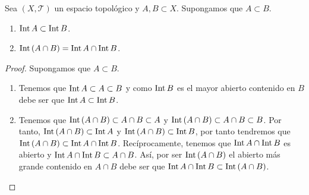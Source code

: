 \begin{prop}
Sea $\displaystyle \left(X, \mathcal{T}\right) $ un espacio topológico y $\displaystyle A,B\subset X $. Supongamos que $\displaystyle A \subset B $. 
\begin{enumerate}
\item $\displaystyle \operatorname{Int} A \subset \operatorname{Int} B $. 
\item $\displaystyle \operatorname{Int} \left(A \cap B\right)= \operatorname{Int} A \cap \operatorname{Int} B $. 
\end{enumerate}
\end{prop}
\begin{proof}
Supongamos que $\displaystyle A \subset B $. 
\begin{enumerate}
\item Tenemos que $\displaystyle \operatorname{Int} A \subset A \subset B $ y como $\displaystyle \operatorname{Int} B $ es el mayor abierto contenido en $\displaystyle B $ debe ser que $\displaystyle \operatorname{Int} A \subset \operatorname{Int} B $. 
\item Tenemos que $\displaystyle \operatorname{Int} \left(A \cap B\right)\subset A \cap B \subset A $ y $\displaystyle \operatorname{Int} \left(A \cap B\right)\subset A \cap B \subset B $. Por tanto, $\displaystyle \operatorname{Int}\left(A \cap B\right)\subset \operatorname{Int} A $ y $\displaystyle \operatorname{Int} \left(A \cap B\right)\subset \operatorname{Int} B $, por tanto tendremos que $\displaystyle \operatorname{Int}\left(A \cap B\right)\subset \operatorname{Int} A \cap \operatorname{Int} B $. Recíprocamente, tenemos que $\displaystyle \operatorname{Int} A \cap \operatorname{Int} B $ es abierto y $\displaystyle \operatorname{Int} A \cap \operatorname{Int} B \subset A \cap B $. Así, por ser $\displaystyle \operatorname{Int} \left(A \cap B\right) $ el abierto más grande contenido en $\displaystyle A \cap B $ debe ser que $\displaystyle \operatorname{Int} A \cap \operatorname{Int} B \subset \operatorname{Int}\left(A \cap B\right) $.
\end{enumerate}	
\end{proof}
